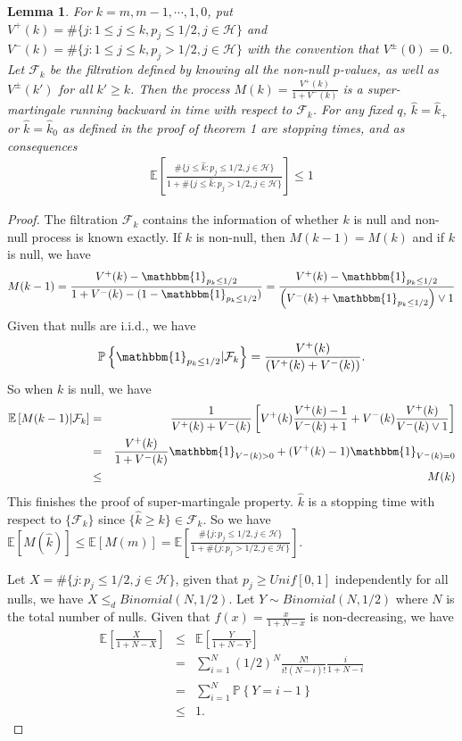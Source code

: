 \documentclass[11pt]{article}
\theoremstyle{plain}
\newtheorem{lemma}[theorem]{Lemma}
\theoremstyle{definition}
\theoremstyle{remark}
\newcommand{\iid}[0]{i.i.d.\xspace}
\newcommand{\PP}[1]{\mathbb{P}\left\{{#1}\right\}} %
\newcommand{\EE}[1]{\mathbb{E}\left[{#1}\right]} %
\newcommand{\0}{\mathbf{0}}
\begin{document}
\begin{lemma}\label{lem:mar}
For $k=m,m-1,\cdots,1,0$, put $V^{+}(k)=\#\{j:1\leq j\leq k, p_j\leq 1/2, j\in \mathcal{H}\}$ and $V^{-}(k)=\#\{ j:1\leq j\leq k, p_j> 1/2, j\in \mathcal{H}\}$ with the convention that $V^{\pm}(0)=0$. Let $\mathcal{F}_k$ be the filtration defined by knowing all the non-null $p$-values, as well as $V^{\pm}(k')$ for all $k'\geq k$. Then the process $M(k)=\frac{V^{+}(k)}{1+V^{-}(k)}$ is a super-martingale running backward in time with respect to $\mathcal{F}_k$. For any fixed $q$, $\widehat{k}=\widehat{k}_{+}$ or $\widehat{k}=\widehat{k}_{0}$ as defined in the proof of theorem 1 are stopping times, and as consequences
\begin{eqnarray*}
\EE{\frac{\#\{j\leq \widehat{k}:p_j\leq 1/2, j\in \mathcal{H}\}}{1+\#\{j\leq \widehat{k}:p_j>1/2, j\in \mathcal{H}\}}}\leq 1
\end{eqnarray*}
\end{lemma}

\begin{proof}
The filtration $\mathcal{F}_k$ contains the information of whether $k$ is null and non-null process is known exactly. If $k$ is non-null, then $M(k-1)=M(k)$ and if $k$ is null, we have
\begin{eqnarray*}
M(k-1)=\frac{V^{+}(k)-\mathbbm{1}_{p_k\leq 1/2}}{1+V^{-}(k)-(1-\mathbbm{1}_{p_k\leq 1/2})}=\frac{V^{+}(k)-\mathbbm{1}_{p_k\leq 1/2}}{\left(V^{-}(k)+\mathbbm{1}_{p_k\leq 1/2}\right)\vee 1}
\end{eqnarray*}
Given that nulls are \iid, we have
\begin{eqnarray*}
\PP{\mathbbm{1}_{p_k\leq 1/2}|\mathcal{F}_k}=\frac{V^{+}(k)}{\left(V^{+}(k)+V^{-}(k)\right)}.
\end{eqnarray*}
So when $k$ is null, we have
\begin{eqnarray*}
\EE{M(k-1)|\mathcal{F}_k}&=&\frac{1}{V^{+}(k)+V^{-}(k)}\left[V^{+}(k)\frac{V^{+}(k)-1}{V^{-}(k)+1}+V^{-}(k)\frac{V^{+}(k)}{V^{-}(k)\vee 1}\right]\\
&=&\frac{V^{+}(k)}{1+V^{-}(k)}\mathbbm{1}_{V^{-}(k)>0}+(V^{+}(k)-1)\mathbbm{1}_{V^{-}(k)=0}\\
&\leq &M(k)
\end{eqnarray*}
This finishes the proof of super-martingale property. $\widehat{k}$ is a stopping time with respect to $\{\mathcal{F}_k\}$ since $\{\widehat{k}\geq k\}\in \mathcal{F}_k$. So we have $\EE{M(\widehat{k})}\leq \EE{M(m)}=\EE{\frac{\#\{j:p_j\leq 1/2, j\in \mathcal{H}\}}{1+\#\{j:p_j>1/2, j\in \mathcal{H}\}}}$.

Let $X=\#\{j:p_j\leq 1/2, j\in \mathcal{H}\}$, given that $p_j\geq Unif[0,1]$ independently for all nulls, we have $X\leq_d Binomial(N,1/2)$. Let $Y\sim Binomial(N,1/2)$ where $N$ is the total number of nulls. Given that $f(x)=\frac{x}{1+N-x}$ is non-decreasing, we have
\begin{eqnarray*}
\EE{\frac{X}{1+N-X}}&\leq &\EE{\frac{Y}{1+N-Y}}\\
&=&\sum_{i=1}^N (1/2)^{N}\frac{N!}{i!(N-i)!}\frac{i}{1+N-i}\\
&=&\sum_{i=1}^N \PP{Y=i-1}\\
&\leq &1.
\end{eqnarray*}
\end{proof}
\end{document}
